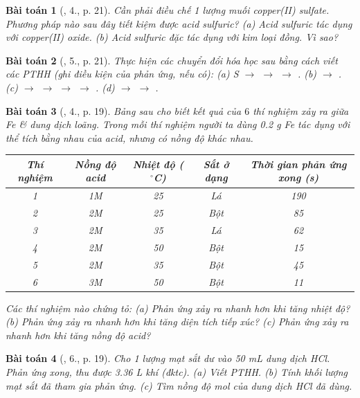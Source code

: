 \documentclass{article}
\newtheorem{baitoan}{Bài toán}
\begin{document}
\begin{baitoan}[\cite{SGK_Hoa_Hoc_9}, 4., p. 21]
	Cần phải điều chế 1 lượng muối copper(II) sulfate. Phương pháp nào sau đây tiết kiệm được acid sulfuric? (a) Acid sulfuric tác dụng với copper(II) oxide. (b) Acid sulfuric đặc tác dụng với kim loại đồng. Vì sao?
\end{baitoan}

\begin{baitoan}[\cite{SGK_Hoa_Hoc_9}, 5., p. 21]
	Thực hiện các chuyển đổi hóa học sau bằng cách viết các PTHH (ghi điều kiện của phản ứng, nếu có): (a) {\rm S $\to$  $\to$  $\to$ }. (b) {\rm{} $\to$ }. (c) {\rm{} $\to$  $\to$  $\to$  $\to$ }. (d) {\rm{} $\to$  $\to$ }.
\end{baitoan}

\begin{baitoan}[\cite{SGK_Hoa_Hoc_9}, 4., p. 19]
	Bảng sau cho biết kết quả của $6$ thí nghiệm xảy ra giữa {\rm Fe} \& dung dịch {\rm{}} loãng. Trong mỗi thí nghiệm người ta dùng {\rm0.2 g Fe} tác dụng với thể tích bằng nhau của acid, nhưng có nồng độ khác nhau.
	\begin{table}[H]
		\centering
		\begin{tabular}{|c|c|c|c|c|}
			\hline
			Thí nghiệm & Nồng độ acid & Nhiệt độ (${}^\circ$C) & Sắt ở dạng & Thời gian phản ứng xong (s) \\
			\hline
			1 & 1M & 25 & Lá & 190 \\
			\hline
			2 & 2M & 25 & Bột & 85 \\
			\hline
			3 & 2M & 35 & Lá & 62 \\
			\hline
			4 & 2M & 50 & Bột & 15 \\
			\hline
			5 & 2M & 35 & Bột & 45 \\
			\hline
			6 & 3M & 50 & Bột & 11 \\
			\hline
		\end{tabular}
	\end{table}
	\noindent Các thí nghiệm nào chứng tỏ: (a) Phản ứng xảy ra nhanh hơn khi tăng nhiệt độ? (b) Phản ứng xảy ra nhanh hơn khi tăng diện tích tiếp xúc? (c) Phản ứng xảy ra nhanh hơn khi tăng nồng độ acid?
\end{baitoan}

\begin{baitoan}[\cite{SGK_Hoa_Hoc_9}, 6., p. 19]
	Cho 1 lượng mạt sắt dư vào {\rm50 mL} dung dịch {\rm HCl}. Phản ứng xong, thu được {\rm3.36 L} khí (đktc). (a) Viết PTHH. (b) Tính khối lượng mạt sắt đã tham gia phản ứng. (c) Tìm nồng độ mol của dung dịch {\rm HCl} đã dùng.
\end{baitoan}
\end{document}
